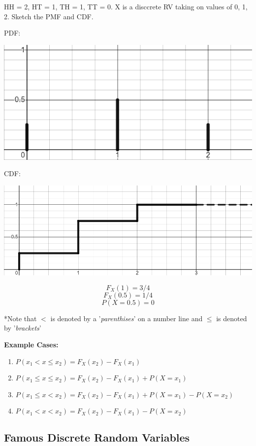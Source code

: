 \documentclass[12pt]{article}
\begin{document}
    HH = 2, HT = 1, TH = 1, TT = 0. X is a disccrete RV taking on values 
    of 0, 1, 2. Sketch the PMF and CDF.

    PDF:
    \begin{center}
        \includegraphics[scale = 0.45]{images/prob_df.png}
    \end{center}

    CDF:
    \begin{center}
        \includegraphics[scale = 0.35]{images/cdf.png}
    \end{center}
    $$F_X(1) = 3/4$$
    $$F_X(0.5) = 1/4$$
    $$P(X=0.5) = 0$$

    *Note that $<$ is denoted by a '\textit{parenthises}' on a 
    number line and $\leq$ is denoted by '\textit{brackets}'

    \textbf{Example Cases:}
    \begin{enumerate}
        \item $P(x_1 < x \leq x_2) = F_X(x_2)-F_X(x_1)$
        \item $P(x_1 \leq x \leq x_2) = F_X(x_2)-F_X(x_1)+P(X=x_1)$
        \item $P(x_1 \leq x < x_2) = F_X(x_2)-F_X(x_1)+P(X=x_1) -
        P(X=x_2)$
        \item $P(x_1 < x < x_2) = F_X(x_2)-F_X(x_1)-P(X=x_2)$
    \end{enumerate}

    \subsection{Famous Discrete Random Variables}
\end{document}
